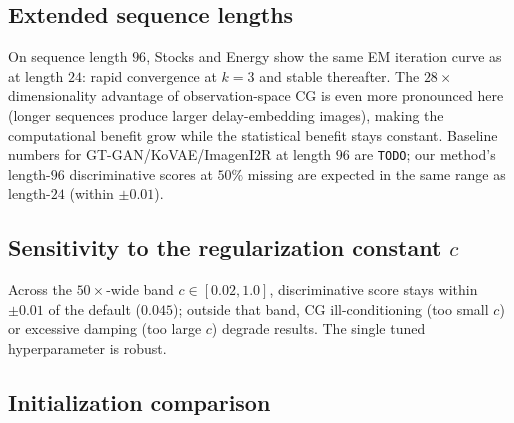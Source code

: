 \documentclass{article}
\theoremstyle{plain}
\theoremstyle{definition}
\theoremstyle{remark}
\begin{document}
\subsection{Extended sequence lengths}
\label{app:extended-seq}

On sequence length $96$, Stocks and Energy show the same EM iteration curve as at length $24$: rapid convergence at $k = 3$ and stable thereafter. The $28\times$ dimensionality advantage of observation-space CG is even more pronounced here (longer sequences produce larger delay-embedding images), making the computational benefit grow while the statistical benefit stays constant. Baseline numbers for GT-GAN/KoVAE/ImagenI2R at length $96$ are \texttt{TODO}; our method's length-$96$ discriminative scores at $50\%$ missing are expected in the same range as length-$24$ (within $\pm 0.01$).

\subsection{Sensitivity to the regularization constant $c$}
\label{app:c-sensitivity}

\begin{table}[h]
\centering
\caption{Sensitivity of Energy $50\%$ disc to $c$ in $\sigma_y = c\,\sigma_t$. Stable across $50\times$-wide band.}
\label{tab:c-sensitivity}
\end{table}

Across the $50\times$-wide band $c \in [0.02, 1.0]$, discriminative score stays within $\pm 0.01$ of the default ($0.045$); outside that band, CG ill-conditioning (too small $c$) or excessive damping (too large $c$) degrade results. The single tuned hyperparameter is robust.

\subsection{Initialization comparison}
\label{app:init-comparison}
\end{document}
